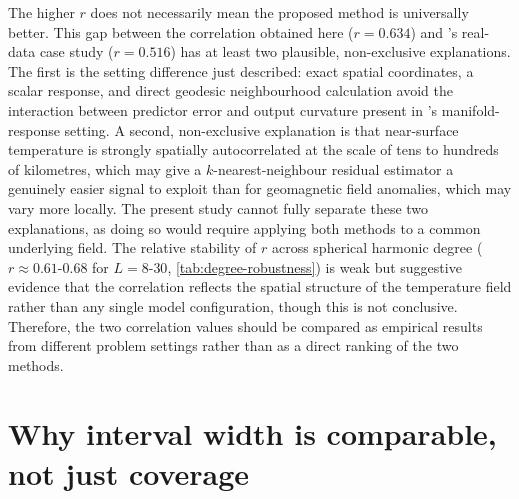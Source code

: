 The higher $r$ does not necessarily mean the proposed method is universally better. This gap between the correlation obtained here ($r = 0.634$) and \citeauthor{amirishahbazi2026}'s real-data case study ($r = 0.516$) has at least two plausible, non-exclusive explanations. The first is the setting difference just described: exact spatial coordinates, a scalar response, and direct geodesic neighbourhood calculation avoid the interaction between predictor error and output curvature present in \citeauthor{amirishahbazi2026}'s manifold-response setting. A second, non-exclusive explanation is that near-surface temperature is strongly spatially autocorrelated at the scale of tens to hundreds of kilometres, which may give a $k$-nearest-neighbour residual estimator a genuinely easier signal to exploit than for geomagnetic field anomalies, which may vary more locally. The present study cannot fully separate these two explanations, as doing so would require applying both methods to a common underlying field. The relative stability of $r$ across spherical harmonic degree ($r \approx 0.61$-$0.68$ for $L = 8$-$30$, \cref{tab:degree-robustness}) is weak but suggestive evidence that the correlation reflects the spatial structure of the temperature field rather than any single model configuration, though this is not conclusive. Therefore, the two correlation values should be compared as empirical results from different problem settings rather than as a direct ranking of the two methods.
 
\section{Why interval width is comparable, not just coverage}

